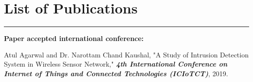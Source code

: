 \chapter*{List of Publications} \label{publications} %
\noindent\rule{\linewidth}{2pt}

\textbf{{\large Paper accepted international conference:}}
\begin{enumerate}[label=\textbf{[\arabic*]}]
	\item Atul Agarwal and Dr. Narottam Chand Kaushal, "A Study of Intrusion Detection System in Wireless Sensor Network," \textit{\textbf{4th International Conference on Internet of Things and Connected Technologies (ICIoTCT)}}, 2019.
\end{enumerate} 